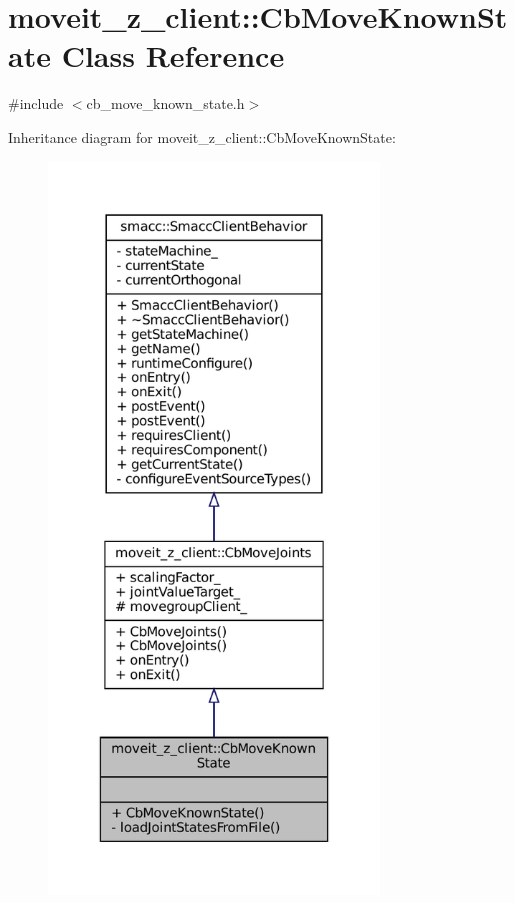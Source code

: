 \hypertarget{classmoveit__z__client_1_1CbMoveKnownState}{}\section{moveit\+\_\+z\+\_\+client\+:\+:Cb\+Move\+Known\+State Class Reference}
\label{classmoveit__z__client_1_1CbMoveKnownState}


{\ttfamily \#include $<$cb\+\_\+move\+\_\+known\+\_\+state.\+h$>$}



Inheritance diagram for moveit\+\_\+z\+\_\+client\+:\+:Cb\+Move\+Known\+State\+:
\nopagebreak
\begin{figure}[H]
\begin{center}
\leavevmode
\includegraphics[height=550pt]{classmoveit__z__client_1_1CbMoveKnownState__inherit__graph}
\end{center}
\end{figure}


